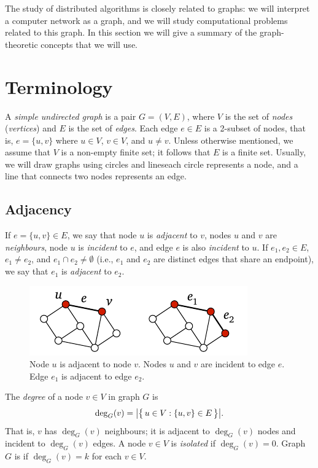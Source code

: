 
The study of distributed algorithms is closely related to graphs: we will interpret a computer network as a graph, and we will study computational problems related to this graph. In this section we will give a summary of the graph-theoretic concepts that we will use.

\section{Terminology}

A \emph{simple undirected graph} is a pair $G = (V,E)$, where $V$ is the set of \emph{nodes} (\emph{vertices}) and $E$ is the set of \emph{edges}. Each edge $e \in E$ is a 2-subset of nodes, that is, $e = \{u,v\}$ where $u \in V$, $v \in V$, and $u \ne v$. Unless otherwise mentioned, we assume that $V$ is a non-empty finite set; it follows that $E$ is a finite set. Usually, we will draw graphs using circles and lines\mydash each circle represents a node, and a line that connects two nodes represents an edge.


\subsection{Adjacency}

If $e = \{u,v\} \in E$, we say that node $u$ is \emph{adjacent} to $v$, nodes $u$ and $v$ are \emph{neighbours}, node $u$ is \emph{incident} to $e$, and edge $e$ is also \emph{incident} to $u$. If $e_1, e_2 \in E$, $e_1 \ne e_2$, and $e_1 \cap e_2 \ne \emptyset$ (i.e., $e_1$ and $e_2$ are distinct edges that share an endpoint), we say that $e_1$ is \emph{adjacent} to $e_2$.
\begin{figure}
    \centering
    \includegraphics[page=\PGraph]{figs.pdf}
    \caption{Node $u$ is adjacent to node $v$. Nodes $u$ and $v$ are incident to edge $e$. Edge $e_1$ is adjacent to edge $e_2$.}\label{fig:graph}
\end{figure}

The \emph{degree} of a node $v \in V$ in graph $G$ is \[
    \deg_G(v) = \bigl|\bigl\{\,  u \in V : \{u,v\} \in E  \,\bigr\}\bigr|.
\]
That is, $v$ has $\deg_G(v)$ neighbours; it is adjacent to $\deg_G(v)$ nodes and incident to $\deg_G(v)$ edges. A node $v \in V$ is \emph{isolated} if $\deg_G(v) = 0$. Graph $G$ is \emph{} if $\deg_G(v) = k$ for each $v \in V$.


